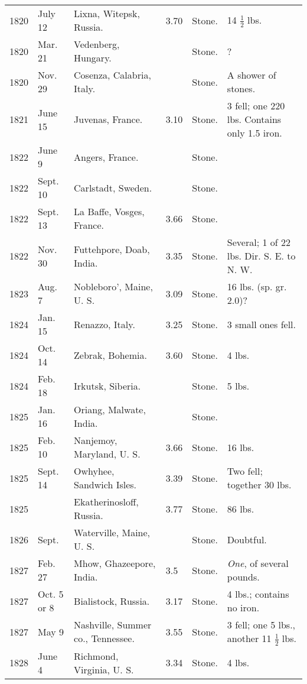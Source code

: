 \documentclass[a4paper, 12pt, oneside]{article}
\begin{document}
\begin{center}
\begin{longtable}{|p{10mm}|p{15mm}|p{32mm}|p{13mm}|p{13mm}|p{26mm}|}
        1820 & July 12 & Lixna, Witepsk, Russia. & 3.70 & Stone. & 14 $\frac{1}{2}$ lbs. \\
        1820 & Mar. 21 & Vedenberg, Hungary. & ~ & Stone. & ? \\
        1820 & Nov. 29 & Cosenza, Calabria, Italy. & ~ & Stone. & A shower of stones. \\
        1821 & June 15 & Juvenas, France. & 3.10 & Stone. & 3 fell; one 220 lbs. Contains only 1.5 iron. \\
        1822 & June 9 & Angers, France. & ~ & Stone. & ~ \\
        1822 & Sept. 10 & Carlstadt, Sweden. & ~ & Stone. & ~ \\
        1822 & Sept. 13 & La Baffe, Vosges, France. & 3.66 & Stone. & ~ \\
        1822 & Nov. 30 & Futtehpore, Doab, India. & 3.35 & Stone. & Several; 1 of 22 lbs. Dir. S. E. to N. W. \\
        1823 & Aug. 7 & Nobleboro’, Maine, U. S. & 3.09 & Stone. & 16 lbs. (sp. gr. 2.0)? \\
        1824 & Jan. 15 & Renazzo, Italy. & 3.25 & Stone. & 3 small ones fell. \\
        1824 & Oct. 14 & Zebrak, Bohemia. & 3.60 & Stone. & 4 lbs. \\
        1824 & Feb. 18 & Irkutsk, Siberia. & ~ & Stone. & 5 lbs. \\
        1825 & Jan. 16 & Oriang, Malwate, India. & ~ & Stone. & ~ \\
        1825 & Feb. 10 & Nanjemoy, Maryland, U. S. & 3.66 & Stone. & 16 lbs. \\
        1825 & Sept. 14 & Owhyhee, Sandwich Isles. & 3.39 & Stone. & Two fell; together 30 lbs. \\
        1825 & ~ & Ekatherinosloff, Russia. & 3.77 & Stone. & 86 lbs. \\
        1826 & Sept. & Waterville, Maine, U. S. & ~ & Stone. & Doubtful. \\
        1827 & Feb. 27 & Mhow, Ghazeepore, India. & 3.5 & Stone. & \emph{One}, of several pounds. \\
        1827 & Oct. 5 or 8 & Bialistock, Russia. & 3.17 & Stone. & 4 lbs.; contains no iron. \\
        1827 & May 9 & Nashville, Summer co., Tennessee. & 3.55 & Stone. & 3 fell; one 5 lbs., another 11 $\frac{1}{2}$ lbs. \\
        1828 & June 4 & Richmond, Virginia, U. S. & 3.34 & Stone. & 4 lbs. \\

\end{longtable}
\end{center}
\end{document}
